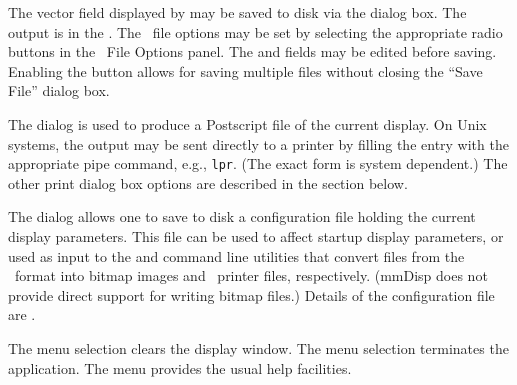 The vector field displayed by  may be saved to disk via the
{} dialog box.  The output
is in the .  The \OVF\ file
options may be set by selecting the appropriate radio buttons in the
\OVF\ File Options panel.  The  and  fields may be
edited before saving.  Enabling the  button allows for
saving multiple files without closing the ``Save File'' dialog box.

The  dialog is used to
produce a Postscript file of the current display.  On Unix systems, the
output may be sent directly to a
printer by filling the
 entry with the appropriate pipe command, e.g.,
\pipe\texttt{lpr}.  (The exact form is system dependent.)  The other
print dialog box options are described in the
 section below.

The  dialog
allows one to save to disk a configuration file holding the current
display parameters.  This file can be used to affect startup display
parameters, or used as input to the  and
 command line utilities
that convert files from the \OVF\ format into bitmap images and
\postscript\ printer files, respectively.  (mmDisp does not provide
direct support for writing bitmap files.)  Details of the configuration
file are .

\label{sec:mmdispcontrols}

The menu selection  clears the display window.
The menu selection  terminates the
 application.  The menu  provides
the usual help facilities.

